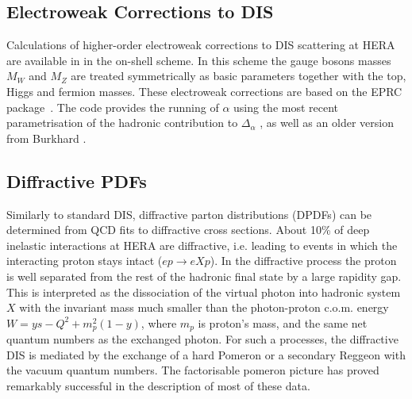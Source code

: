\subsection{Electroweak Corrections to DIS}
Calculations of higher-order electroweak corrections to DIS scattering at 
HERA are available in \fitter in the on-shell scheme. In this scheme the
gauge bosons masses $M_W$ and 
$M_Z$ are treated symmetrically as basic parameters together with the top, 
Higgs and fermion masses.
These electroweak corrections 
are based on the EPRC package~\cite{SpiesbergerPrivComm}.
The code provides the running of $\alpha$ using the most recent parametrisation
of the hadronic contribution to $\Delta_\alpha$ \cite{Jegerlehner}, as well as 
an older version from Burkhard \cite{Burkhard}.



\subsection{Diffractive PDFs}

\newcommand{\asotp}{\ensuremath{\frac{\alpha_{\rm s}}{2\pi}}}
\newcommand{\Sgl}[1]{\ensuremath{\tilde f_{#1+}}}
\newcommand{\Pom}{{I\!P}}
\newcommand{\Reg}{{I\!R}}
\newcommand{\xpom}{$x_{I\!P}$}
\newcommand{\xP}{x_\Pom}


Similarly to standard DIS, diffractive parton distributions (DPDFs) 
can be determined from QCD fits to diffractive cross sections.
About 10\% of deep inelastic interactions at HERA are diffractive, i.e. leading to
events in which the interacting proton stays intact ($ep\to eXp$). 
In the diffractive process the proton is well separated from the 
rest of the hadronic final state by a large rapidity gap.  
This is interpreted as the dissociation of the virtual photon into
hadronic system $X$ with the invariant mass much 
smaller than the photon-proton c.o.m. energy $W=ys-Q^2+m_p^2(1-y)$, where $m_p$ is proton's mass,  and the same net 
quantum numbers as the exchanged photon.
For such a processes, the 
diffractive DIS is mediated by the exchange of a hard Pomeron 
or a secondary Reggeon with the vacuum quantum numbers. 
The factorisable pomeron picture has proved remarkably successful in the description of most of these data.
%

